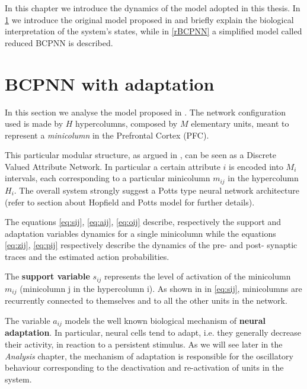 In this chapter we introduce the dynamics of the model adopted in this thesis. In \cref{bcpnn_complete} we introduce the original model proposed in \cite{LansnerFRC} and briefly explain the biological interpretation of the system's states, while in \cref{rBCPNN} a simplified model called reduced BCPNN is described.

\section{BCPNN with adaptation}
\label{bcpnn_complete}
In this section we analyse the model proposed in \cite{LansnerFRC}. The network configuration used is made by $H$ hypercolumns, composed by $M$ elementary units, meant to represent a \textit{minicolumn} in the Prefrontal Cortex (PFC).

This particular modular structure, as argued in \cite[Chapter~3.3.2]{sandberg2003bayesian}, can be seen as a Discrete Valued Attribute Network. In particular a certain attribute $i$ is encoded into $M_i$ intervals, each corresponding to a particular minicolumn $m_{ij}$ in the hypercolumn $H_i$. The overall system strongly suggest a Potts type neural network architecture (refer to section about Hopfield and Potts model for further details).

\iffalse
\begin{figure}
\centering
  \texttt{[image: myPictureName.png]}%
  \caption{High level organization of the Discrete Valued Attribute Network BCPNN}
\end{figure}
\fi
The equations \eqref{eq:sij}, \eqref{eq:aij}, \eqref{eq:oij} describe, respectively the support and adaptation variables dynamics for a single minicolumn while the equations \eqref{eq:zij}, \eqref{eq:pij} respectively describe the dynamics of the pre- and post- synaptic traces and the estimated action probabilities. 

The\textbf{ support variable} $s_{ij}$ represents the level of activation of the minicolumn $m_{ij}$ (minicolumn j in the hypercolumn i). As shown in in \eqref{eq:sij}, minicolumns are recurrently connected to themselves and to all the other units in the network. 

The variable $a_{ij}$ models the well known biological mechanism of \textbf{neural adaptation}. In particular, neural cells tend to adapt, i.e. they generally decrease their activity, in reaction to a persistent stimulus. As we will see later in the \textit{Analysis} chapter, the mechanism of adaptation is responsible for the oscillatory behaviour corresponding to the deactivation and re-activation of units in the system.

